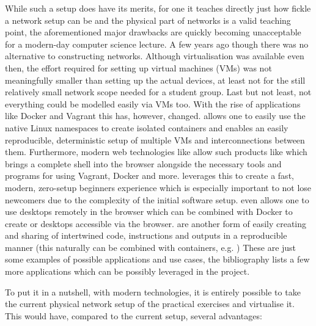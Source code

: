 While such a setup does have its merits, for one it teaches directly just how fickle a network setup can be and the physical part of networks is a valid teaching point, the aforementioned major drawbacks are quickly becoming unacceptable for a modern-day computer science lecture.
A few years ago though there was no alternative to constructing networks.
Although virtualisation was available even then, the effort required for setting up virtual machines (VMs) was not meaningfully smaller than setting up the actual devices, at least not for the still relatively small network scope needed for a student group.
Last but not least, not everything could be modelled easily via VMs too.
With the rise of applications like Docker and Vagrant this has, however, changed.
 allows one to easily use the native Linux namespaces to create isolated containers and  enables an easily reproducible, deterministic setup of multiple VMs and interconnections between them.
Furthermore, modern web technologies like  allow such products like  which brings a complete shell into the browser
alongside the necessary tools and programs for using Vagrant,
Docker and more.
  leverages this to create a fast, modern, zero-setup beginners experience which is especially important to not lose newcomers due to the complexity of the initial software setup.
 even allows one to use desktops remotely in the browser which can be combined with Docker to create  or desktops accessible via the browser.
 are another form of easily creating and sharing of intertwined code, instructions and outputs in a reproducible manner (this naturally can be combined with containers, e.g. )
These are just some examples of possible applications and use cases, the bibliography lists a few more applications which can be possibly leveraged in the project.

To put it in a nutshell, with modern technologies, it is entirely possible to take the current physical network setup of the practical exercises and virtualise it.
This would have, compared to the current setup, several advantages:

